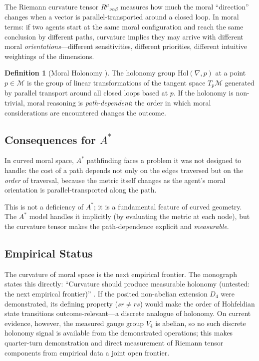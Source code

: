 \documentclass[12pt,letterpaper]{article}
\theoremstyle{definition}
\newtheorem{definition}[theorem]{Definition}
\newcommand{\calM}{\mathcal{M}}
\begin{document}
The Riemann curvature tensor $R^\mu{}_{\nu\alpha\beta}$ measures how much the moral ``direction'' changes when a vector is parallel-transported around a closed loop. In moral terms: if two agents start at the same moral configuration and reach the same conclusion by different paths, curvature implies they may arrive with different moral \emph{orientations}---different sensitivities, different priorities, different intuitive weightings of the dimensions.

\begin{definition}[Moral Holonomy {\cite[\S8.9]{bond2026ge}}]
The holonomy group $\mathrm{Hol}(\nabla, p)$ at a point $p \in \calM$ is the group of linear transformations of the tangent space $T_p\calM$ generated by parallel transport around all closed loops based at $p$. If the holonomy is non-trivial, moral reasoning is \emph{path-dependent}: the order in which moral considerations are encountered changes the outcome.
\end{definition}

\subsection{Consequences for $A^*$}

In curved moral space, $A^*$ pathfinding faces a problem it was not designed to handle: the cost of a path depends not only on the edges traversed but on the \emph{order} of traversal, because the metric itself changes as the agent's moral orientation is parallel-transported along the path.

This is not a deficiency of $A^*$; it is a fundamental feature of curved geometry. The $A^*$ model handles it implicitly (by evaluating the metric at each node), but the curvature tensor makes the path-dependence explicit and \emph{measurable}.

\subsection{Empirical Status}

The curvature of moral space is the next empirical frontier. The monograph states this directly: ``Curvature should produce measurable holonomy (untested: the next empirical frontier)'' \cite[\S22]{bond2026ge}. If the posited non-abelian extension $D_4$ were demonstrated, its defining property ($sr \neq rs$) would make the order of Hohfeldian state transitions outcome-relevant---a discrete analogue of holonomy. On current evidence, however, the measured gauge group $V_4$ is abelian, so no such discrete holonomy signal is available from the demonstrated operations; this makes quarter-turn demonstration and direct measurement of Riemann tensor components from empirical data a joint open frontier.
\end{document}
